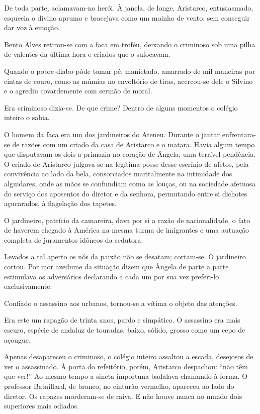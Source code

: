 De toda parte, aclamavam{}-no herói. À janela,
de longe, Aristarco, entusiasmado, esquecia o divino aprumo e bracejava
como um moinho de vento, sem conseguir dar voz à emoção. 

Bento Alves
retirou{}-se com a faca em troféu, deixando o criminoso sob uma pilha
de valentes da última hora e criados que o sufocavam. 

Quando o
pobre{}-diabo pôde tomar pé, manietado, amarrado de mil maneiras por
cintas de couro, como as múmias no envoltório de tiras, acercou{}-se
dele o Silvino e o agrediu covardemente com sermão de moral. 

Era criminoso dizia{}-se. De que crime? Dentro de alguns momentos o colégio
inteiro o sabia. 

O homem da faca era um dos jardineiros do Ateneu.
Durante o jantar enfrentara{}-se de razões com um criado da casa de
Aristarco e o matara. Havia algum tempo que disputavam os dois a
primazia no coração de Ângela; uma terrível pendência. O criado de
Aristarco julgava{}-se na legítima posse desse escrínio de afetos, pela
convivência ao lado da bela, consorciados maritalmente na intimidade
dos alguidares, onde as mãos se confundiam como as louças, ou na
sociedade afetuosa do serviço dos aposentos do diretor e da senhora,
permutando entre si dichotes açucarados, à flagelação dos tapetes. 

O jardineiro, patrício da camareira, dava por si a razão de
nacionalidade, o fato de haverem chegado à América na mesma turma de
imigrantes e uma autuação completa de juramentos idôneos da sedutora.

Levados a tal aperto os nós da paixão não se desatam; cortam{}-se. O
jardineiro cortou. Por mor azedume da situação dizem que Ângela de
parte a parte estimulava os adversários declarando a cada um por sua 
vez preferi{}-lo exclusivamente. 

Confiado o assassino aos
urbanos, tornou{}-se a vítima o objeto das atenções. 

Era este um
rapagão de trinta anos, pardo e simpático. O assassino era mais escuro,
espécie de andaluz de touradas, baixo, sólido, grosso como um cepo de
açougue. 

Apenas desapareceu o criminoso, o colégio inteiro assaltou a
escada, desejosos de ver o assassinado. À porta do refeitório, porém,
Aristarco despachou: ``não têm que ver!'' Ao mesmo tempo a sineta
importuna badalava chamando à forma. O professor Bataillard, de branco,
no cinturão vermelho, apareceu ao lado do diretor. Os rapazes
morderam{}-se de raiva. E não houve nunca no mundo dois superiores mais
odiados. 

